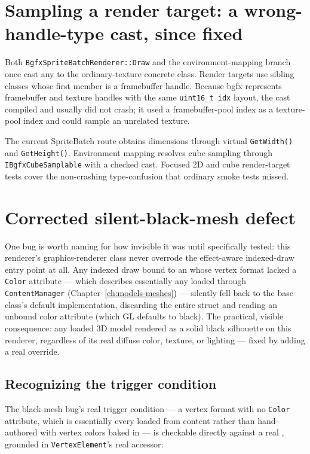 \section{Sampling a render target: a wrong-handle-type cast, since fixed}
\label{sec:bgfx-wrong-handle-cast}

Both \texttt{BgfxSpriteBatchRenderer::Draw} and the environment-mapping branch once cast any
 to the ordinary-texture concrete class. Render targets use sibling
classes whose first member is a framebuffer handle. Because bgfx represents framebuffer and
texture handles with the same \texttt{uint16\_t idx} layout, the cast compiled and usually did
not crash; it used a framebuffer-pool index as a texture-pool index and could sample an unrelated
texture.

The current SpriteBatch route obtains dimensions through virtual \texttt{GetWidth()} and
\texttt{GetHeight()}. Environment mapping resolves cube sampling through
\texttt{IBgfxCubeSamplable} with a checked cast. Focused 2D and cube render-target tests cover the
non-crashing type-confusion that ordinary smoke tests missed.

\section{Corrected silent-black-mesh defect}

One bug is worth naming for how invisible it was until specifically tested: this renderer's
graphics-renderer class never overrode the effect-aware indexed-draw entry point at all. Any
indexed draw bound to an  whose vertex format lacked a \texttt{Color}
attribute --- which describes essentially any  loaded through
\texttt{ContentManager} (Chapter~\ref{ch:models-meshes}) --- silently fell back to the base
class's default implementation, discarding the entire  struct and
reading an unbound color attribute (which GL defaults to black). The practical, visible
consequence: any loaded 3D model rendered as a solid black silhouette on this renderer,
regardless of its real diffuse color, texture, or lighting --- fixed by adding a real
override.

\subsection{Recognizing the trigger condition}

The black-mesh bug's real trigger condition --- a vertex format with no \texttt{Color}
attribute, which is essentially every  loaded from content rather than
hand-authored with vertex colors baked in --- is checkable directly against a real
, grounded in \texttt{VertexElement}'s real accessor:


